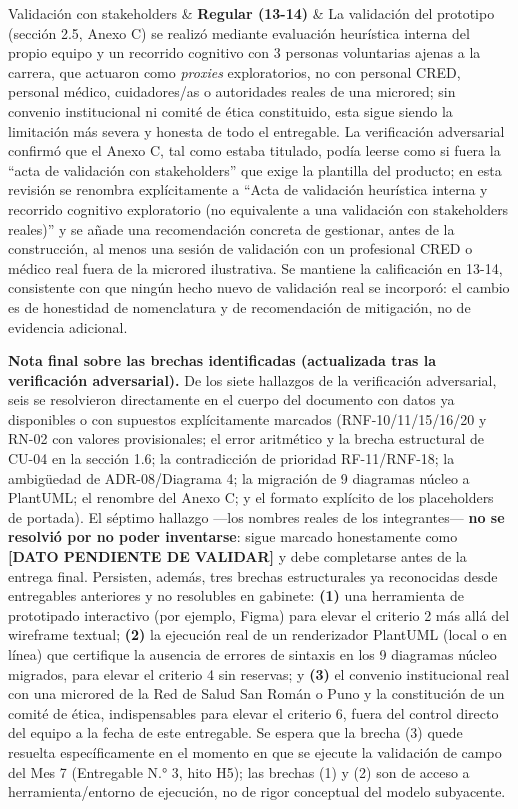 \documentclass[11pt,a4paper]{article}
\begin{document}
{\begin{longtable}[]
Validación con stakeholders & \textbf{Regular (13-14)} & La validación del prototipo (sección 2.5, Anexo C) se realizó mediante evaluación heurística interna del propio equipo y un recorrido cognitivo con 3 personas voluntarias ajenas a la carrera, que actuaron como \emph{proxies} exploratorios, no con personal CRED, personal médico, cuidadores/as o autoridades reales de una microred; sin convenio institucional ni comité de ética constituido, esta sigue siendo la limitación más severa y honesta de todo el entregable. La verificación adversarial confirmó que el Anexo C, tal como estaba titulado, podía leerse como si fuera la ``acta de validación con stakeholders'' que exige la plantilla del producto; en esta revisión se renombra explícitamente a ``Acta de validación heurística interna y recorrido cognitivo exploratorio (no equivalente a una validación con stakeholders reales)'' y se añade una recomendación concreta de gestionar, antes de la construcción, al menos una sesión de validación con un profesional CRED o médico real fuera de la microred ilustrativa. Se mantiene la calificación en 13-14, consistente con que ningún hecho nuevo de validación real se incorporó: el cambio es de honestidad de nomenclatura y de recomendación de mitigación, no de evidencia adicional. \\
\end{longtable}
}

\textbf{Nota final sobre las brechas identificadas (actualizada tras la verificación adversarial).} De los siete hallazgos de la verificación adversarial, seis se resolvieron directamente en el cuerpo del documento con datos ya disponibles o con supuestos explícitamente marcados (RNF-10/11/15/16/20 y RN-02 con valores provisionales; el error aritmético y la brecha estructural de CU-04 en la sección 1.6; la contradicción de prioridad RF-11/RNF-18; la ambigüedad de ADR-08/Diagrama 4; la migración de 9 diagramas núcleo a PlantUML; el renombre del Anexo C; y el formato explícito de los placeholders de portada). El séptimo hallazgo ---los nombres reales de los integrantes--- \textbf{no se resolvió por no poder inventarse}: sigue marcado honestamente como \textbf{{[}DATO PENDIENTE DE VALIDAR{]}} y debe completarse antes de la entrega final. Persisten, además, tres brechas estructurales ya reconocidas desde entregables anteriores y no resolubles en gabinete: \textbf{(1)} una herramienta de prototipado interactivo (por ejemplo, Figma) para elevar el criterio 2 más allá del wireframe textual; \textbf{(2)} la ejecución real de un renderizador PlantUML (local o en línea) que certifique la ausencia de errores de sintaxis en los 9 diagramas núcleo migrados, para elevar el criterio 4 sin reservas; y \textbf{(3)} el convenio institucional real con una microred de la Red de Salud San Román o Puno y la constitución de un comité de ética, indispensables para elevar el criterio 6, fuera del control directo del equipo a la fecha de este entregable. Se espera que la brecha (3) quede resuelta específicamente en el momento en que se ejecute la validación de campo del Mes 7 (Entregable N.° 3, hito H5); las brechas (1) y (2) son de acceso a herramienta/entorno de ejecución, no de rigor conceptual del modelo subyacente.
\end{document}

